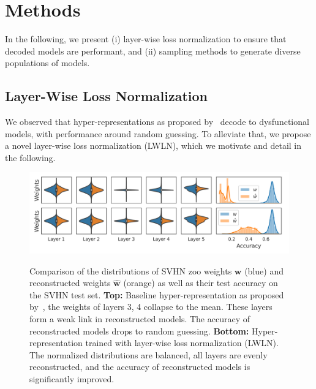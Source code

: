 \documentclass{article}
\begin{document}
\section{Methods}
\label{sec:methods}
In the following, we present (i) layer-wise loss normalization to ensure that decoded models are performant, and (ii) sampling methods to generate diverse populations of models.
\subsection{Layer-Wise Loss Normalization}\label{sec:lwln}
We observed that hyper-representations as proposed by~\citep{schurholtSelfSupervisedRepresentationLearning2021} decode to dysfunctional models, with performance around random guessing. 
To alleviate that, we propose a novel layer-wise loss normalization (LWLN), which we motivate and detail in the following.
%
\begin{figure}[h!]
\begin{minipage}[t]{0.98\textwidth}
\begin{center}
\vspace{-4mm} 
\includegraphics[trim=0mm 0mm 0mm 0mm, clip, width=0.9\linewidth]{figures/weight_distribution_accuracy_recon_comparison.png}
\vspace{-6mm} 
\caption{
\small Comparison of the distributions of SVHN zoo weights $\mathbf{w}$ (blue) and reconstructed weights $\hat{\mathbf{w}}$ (orange) as well as their test accuracy on the SVHN test set. 
\textbf{Top:} Baseline hyper-representation as proposed by~\citep{schurholtSelfSupervisedRepresentationLearning2021}, the weights of layers 3, 4 collapse to the mean. These layers form a weak link in reconstructed models. The accuracy of reconstructed models drops to random guessing.
\textbf{Bottom:} Hyper-representation trained with layer-wise loss normalization (LWLN). The normalized distributions are balanced, all layers are evenly reconstructed, and the accuracy of reconstructed models is significantly improved.
}
\vspace{-3mm} 
\label{fig:layer_norm_eval}    
\end{center}
\end{minipage}
\end{figure}
\end{document}
